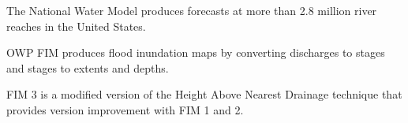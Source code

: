 


\begin{keypoints}
\item The National Water Model produces forecasts at more than 2.8 million river reaches in the United States.
\item OWP FIM produces flood inundation maps by converting discharges to stages and stages to extents and depths.
\item FIM 3 is a modified version of the Height Above Nearest Drainage technique that provides version improvement with FIM 1 and 2.
\end{keypoints}
